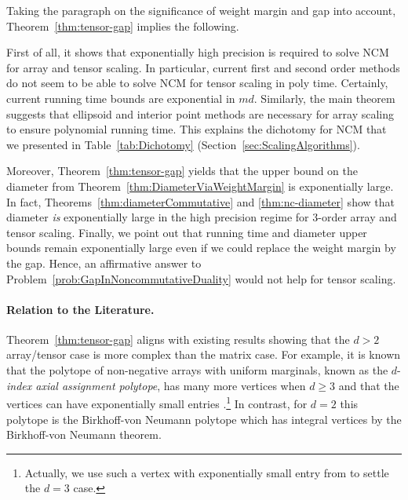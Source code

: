 Taking the paragraph on the significance of weight margin and gap into account, Theorem~\ref{thm:tensor-gap} implies the following.

First of all, it shows that exponentially high precision is required to solve NCM for array and tensor scaling. In particular, current first and second order methods do not seem to be able to solve NCM for tensor scaling in poly time. Certainly, current running time bounds are exponential in $md$. Similarly, the main theorem suggests that ellipsoid and interior point methods are necessary for array scaling to ensure polynomial running time. This explains the dichotomy for NCM that we presented in Table~\ref{tab:Dichotomy} (Section~\ref{sec:ScalingAlgorithms}).

Moreover, Theorem~\ref{thm:tensor-gap} yields that the upper bound on the diameter from Theorem~\ref{thm:DiameterViaWeightMargin} is exponentially large. In fact, Theorems~\ref{thm:diameterCommutative} and \ref{thm:nc-diameter} show that diameter \emph{is} exponentially large in the high precision regime for 3-order array and tensor scaling. Finally, we point out that running time and diameter upper bounds remain exponentially large even if we could replace the weight margin by the gap. Hence, an affirmative answer to Problem~\ref{prob:GapInNoncommutativeDuality} would not help for tensor scaling.

\paragraph{Relation to the Literature.}
Theorem~\ref{thm:tensor-gap} aligns with existing results showing that the $d>2$ array/tensor case is more complex than the matrix case. For example, it is known that the polytope of non-negative arrays with uniform marginals, known as the $d$-\emph{index axial assignment polytope}, has many more vertices when $d \geq 3$ and that the vertices can have exponentially small entries \cite{krav, linial2014vertices}.\footnote{Actually, we use such a vertex with exponentially small entry from \cite{krav} to settle the $d=3$ case.}
In contrast, for $d = 2$ this polytope is the Birkhoff-von Neumann polytope which has integral vertices by the Birkhoff-von Neumann theorem.

